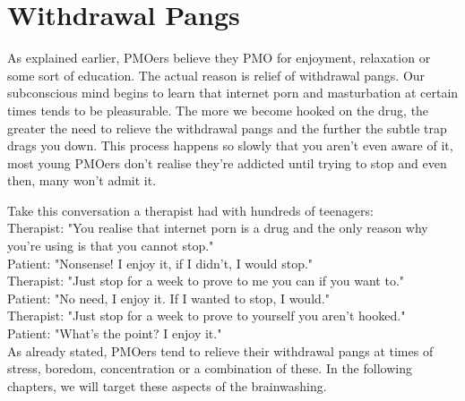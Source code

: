 \documentclass[easypeasy.tex]{subfiles}
\begin{document}
\section{Withdrawal Pangs}

As explained earlier, PMOers believe they PMO for enjoyment, relaxation or some sort of education. The actual reason is relief of withdrawal pangs. Our subconscious mind begins to learn that internet porn and masturbation at certain times tends to be pleasurable. The more we become hooked on the drug, the greater the need to relieve the withdrawal pangs and the further the subtle trap drags you down. This process happens so slowly that you aren't even aware of it, most young PMOers don't realise they're addicted until trying to stop and even then, many won't admit it.

Take this conversation a therapist had with hundreds of teenagers:\\
  Therapist: "You realise that internet porn is a drug and the only reason why you're using is that you cannot stop."\\
  Patient: "Nonsense! I enjoy it, if I didn't, I would stop."\\
  Therapist: "Just stop for a week to prove to me you can if you want to."\\
  Patient: "No need, I enjoy it. If I wanted to stop, I would."\\
  Therapist: "Just stop for a week to prove to yourself you aren't hooked."\\
  Patient: "What's the point? I enjoy it."\\

As already stated, PMOers tend to relieve their withdrawal pangs at times of stress, boredom, concentration or a combination of these. In the following chapters, we will target these aspects of the brainwashing.
\end{document}
